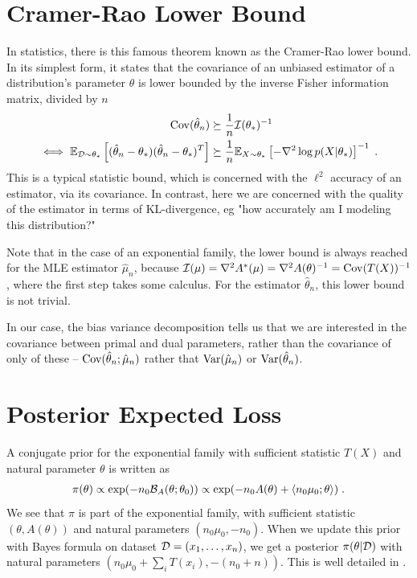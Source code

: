\documentclass{article}
\newcommand*{\expect}[2][]{\ensuremath{\mathbb{E}_{#1} \left[ #2 \right] }} %
\newcommand{\logpart}{A}
\newcommand{\conj}{\logpart^*}
\newcommand{\bregman}{\cB_\logpart}
\newcommand{\natp}{\theta}
\newcommand{\MAPm}{\hat \mu_n}
\newcommand{\MAPt}{\hat \natp_n}
\begin{document}




\newpage
\appendix

\section{Cramer-Rao Lower Bound}
In statistics, there is this famous theorem known as the Cramer-Rao lower bound. In its simplest form, it states that the covariance of an unbiased estimator of a distribution's parameter $\natp$ is lower bounded by the inverse Fisher information matrix, divided by $n$
\begin{align}
    \Cov(\hat \natp_n)  
    &\succeq \inv{n} \cI(\natp_*)^{-1} \\
    \iff
    \expect[\cD\sim \natp_*]{(\hat \natp_n - \natp_*)(\hat \natp_n - \natp_*)^T}
    &\succeq \inv{n} \expect[X\sim \natp_*]{-\nabla^2 \log p(X|\natp_*)}^{-1} \; .
\end{align}
This is a typical statistic bound, which is concerned with the $\ell^2$ accuracy of an estimator, via its covariance. In contrast, here we are concerned with the quality of the estimator in terms of KL-divergence, eg "how accurately am I modeling this distribution?"

Note that in the case of an exponential family, the lower bound is always reached for the MLE estimator $\hat \mu_n$, because $\cI(\mu) = \nabla^2 \conj(\mu) = \nabla^2 \logpart(\natp)^{-1} = \Cov(T(X))^{-1}$, where the first step takes some calculus. For the estimator $\hat \natp_n$, this lower bound is not trivial.

In our case, the bias variance decomposition tells us that we are interested in the covariance between primal and dual parameters, rather than the covariance of only of these -- $\Cov(\MAPt;\MAPm)$ rather that $\Var(\MAPm)$ or $\Var(\MAPt)$.

\section{Posterior Expected Loss}

A conjugate prior for the exponential family with sufficient statistic $T(X)$ and natural parameter $\natp$ is written as
\begin{align}
    \pi(\natp) 
    \propto \exp(-n_0 \bregman(\natp ; \natp_0)) 
    \propto \exp(-n_0 \logpart(\natp) + \langle n_0 \mu_0 ; \natp \rangle) \; .
\end{align}
We see that $\pi$ is part of the exponential family, with sufficient statistic $(\natp, \logpart(\natp))$ and natural parameters $(n_0 \mu_0 , -n_0)$. When we update this prior with Bayes formula on dataset ${\mathcal D}=(x_1,\dots,x_n)$, we get a posterior $\pi(\natp | \cD)$ with natural parameters $(n_0 \mu_0 + \sum_i T(x_i) , -(n_0 + n))$. This is well detailed in \citet{agarwal2010geometric}. 
\end{document}
